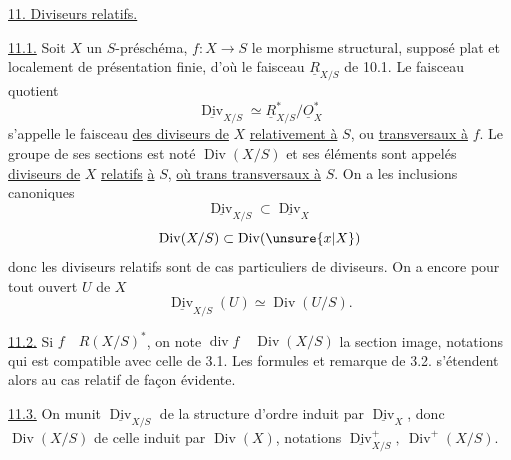 \uline{11. Diviseurs relatifs.}

\uline{11.1.} Soit $X$ un $S$-préschéma, $f:X\longrightarrow S$ le morphisme
structural, supposé plat et localement de présentation finie,
d'où le faisceau $\underline R_{X/S}$ de 10.1. Le faisceau quotient
\[
\underline{\operatorname{Div}}_{X/S}\simeq\underline R_{X/S}^{\ast}/\underline O_X^{\ast}
\]
s'appelle le faisceau \uline{des diviseurs de} $X$ \uline{relativement à} $S$, ou
\uline{transversaux à} $f$. Le groupe de ses sections est noté
$\operatorname{Div}(X/S)$ et ses éléments sont appelés \uline{diviseurs de} $X$ \uline{relatifs}
\uline{à} $S$, \uline{où trans transversaux à} $S$. On a les inclusions canoniques
\[
\underline{\operatorname{Div}}_{X/S}\subset\underline{\operatorname{Div}}_X
\]
\[
\operatorname{Div}(X/S)\subset\operatorname{Div}(\unsure{x|X})
\]
donc les diviseurs relatifs sont de cas particuliers de diviseurs.
On a encore pour tout ouvert $U$ de $X$
\[
\underline{\operatorname{Div}}_{X/S}(U)\simeq\operatorname{Div}(U/S).
\]

\uline{11.2.} Si $f\quad R(X/S)^{\ast}$, on note $\operatorname{div}f\quad\operatorname{Div}(X/S)$ la section
image, notations qui est compatible avec celle de 3.1. Les
formules et remarque de 3.2. s'étendent alors au cas relatif
de façon évidente.

\uline{11.3.} On munit $\underline{\operatorname{Div}}_{X/S}$ de la structure d'ordre induit par
$\underline{\operatorname{Div}}_X$, donc $\operatorname{Div}(X/S)$ de celle induit par
$\operatorname{Div}(X)$, notations $\underline{\operatorname{Div}}_{X/S}^{+},\ \operatorname{Div}^{+}(X/S)$.
